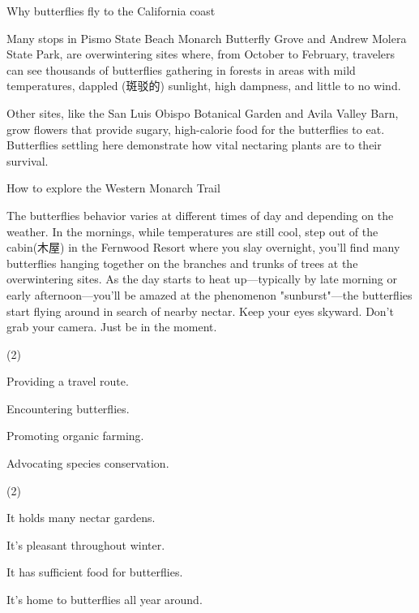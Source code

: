\documentclass{英语试卷}
\begin{document}
\par Why butterflies fly to the California coast\par
\par Many stops in Pismo State Beach Monarch Butterfly Grove and Andrew Molera State Park, are overwintering sites where, from October to February, travelers can see thousands of butterflies gathering in forests in areas with mild temperatures, dappled (斑驳的) sunlight, high dampness, and little to no wind.\par
\par Other sites, like the San Luis Obispo Botanical Garden and Avila Valley Barn, grow flowers that provide sugary, high-calorie food for the butterflies to eat. Butterflies settling here demonstrate how vital nectaring plants are to their survival.\par
\par How to explore the Western Monarch Trail\par
\par The butterflies behavior varies at different times of day and depending on the weather. In the mornings, while temperatures are still cool, step out of the cabin(木屋) in the Fernwood Resort where you slay overnight, you'll find many butterflies hanging together on the branches and trunks of trees at the overwintering sites. As the day starts to heat up—typically by late morning or early afternoon—you'll be amazed at the phenomenon "sunburst"—the butterflies start flying around in search of nearby nectar. Keep your eyes skyward. Don't grab your camera. Just be in the moment.\par
{}
\begin{choices}(2)
  \item Providing a travel route.
  \item Encountering butterflies.
  \item Promoting organic farming.
  \item Advocating species conservation.
\end{choices}
\begin{choices}(2)
  \item It holds many nectar gardens.
  \item It's pleasant throughout winter.
  \item It has sufficient food for butterflies.
  \item It's home to butterflies all year around.
\end{choices}
\end{document}
